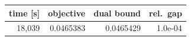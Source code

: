 \begin{tabular}{r r r r}
\toprule
time [s] & objective & dual bound & rel.\ gap \\
\midrule
18,039 & 0.0465383 & 0.0465429 & 1.0e-04 \\
\bottomrule
\end{tabular}
